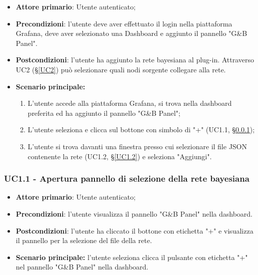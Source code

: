 \begin{itemize}
	\item \textbf{Attore primario}: Utente autenticato;
	\item \textbf{Precondizioni}: l'utente deve aver effettuato il login nella piattaforma Grafana, deve aver selezionato una Dashboard e aggiunto il pannello "G\&B Panel".
	\item \textbf{Postcondizioni}: l'utente ha aggiunto la rete bayesiana al plug-in. Attraverso UC2 (§\ref{UC2}) può selezionare quali nodi sorgente collegare alla rete.
	\item \textbf{Scenario principale:}
	\begin{enumerate}
		\item L'utente accede alla piattaforma Grafana, si trova nella dashboard preferita ed ha aggiunto il pannello "G\&B Panel";
		\item L'utente seleziona e clicca sul bottone con simbolo di "+" (UC1.1, §\ref{UC1.1});
		\item L'utente si trova davanti una finestra presso cui selezionare il file JSON contenente la rete (UC1.2, §\ref{UC1.2}) e seleziona "Aggiungi".
	\end{enumerate}
\end{itemize}

\subsubsection{UC1.1 - Apertura pannello di selezione della rete bayesiana}\label{UC1.1}
\begin{itemize}
	\item \textbf{Attore primario}: Utente autenticato; 
	\item \textbf{Precondizioni}: l'utente visualizza il pannello "G\&B Panel" nella dashboard.
	\item \textbf{Postcondizioni}: l'utente ha cliccato il bottone con etichetta "+" e visualizza il pannello per la selezione del file della rete.
	\item \textbf{Scenario principale:} l'utente seleziona clicca il pulsante con etichetta "+" nel pannello "G\&B Panel" nella dashboard.
\end{itemize}


